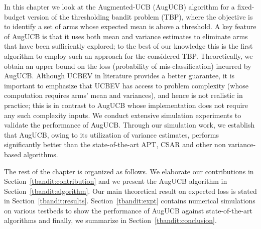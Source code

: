 In this chapter we look at the Augmented-UCB (AugUCB) algorithm for a fixed-budget version of the thresholding bandit problem (TBP), where the objective is to identify a set of arms whose expected mean is above a threshold. A key feature of AugUCB is that it uses both mean and variance estimates to eliminate arms that have been sufficiently explored; to the best of our knowledge this is the first algorithm to employ such an approach for the considered TBP.  Theoretically, we obtain an upper bound on the loss (probability of mis-classification) incurred by AugUCB. Although UCBEV in literature provides a better guarantee, it is important to emphasize that UCBEV has access to problem complexity (whose computation requires arms' mean and variances), and hence is not realistic in practice; this is in contrast to AugUCB whose implementation does not require any such complexity inputs. We conduct extensive simulation experiments to validate the performance of AugUCB. Through our simulation work, we establish that AugUCB, owing to its utilization of variance estimates, performs significantly better than the state-of-the-art APT, CSAR and other non variance-based algorithms.

The rest of the chapter is organized as follows. We elaborate our contributions in Section~\ref{tbandit:contribution} and  we present the AugUCB algorithm in Section~\ref{tbandit:algorithm}. Our main theoretical result on expected loss is stated in Section~\ref{tbandit:results}. Section~\ref{tbandit:expt} contains numerical simulations on various testbeds to show the performance of AugUCB against state-of-the-art algorithms and finally, we summarize in Section~\ref{tbandit:conclusion}.